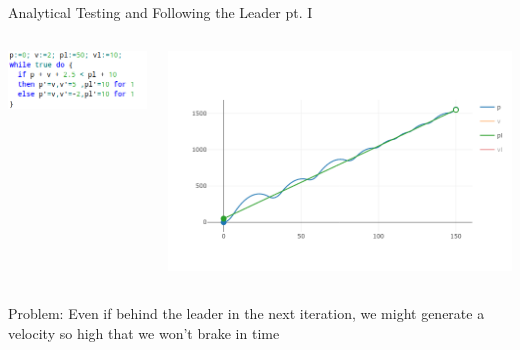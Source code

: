 \documentclass{beamer}
\begin{document}
\begin{frame}{Analytical Testing and Following the Leader pt. I}
  \begin{minipage}[0.3\textheight]{\textwidth}
  \begin{columns}[c]
  \begin{column}{0.45\textwidth}
   \hspace{0.3cm}
   \includegraphics[scale=0.38]{./images/fl1.png}
  \end{column}
  \begin{column}{1\textwidth}
    \includegraphics[scale=0.3]{./images/fl_plot.png}
  \end{column}
  \end{columns}
  \end{minipage}

  \pause
  Problem: Even if behind the leader in the next iteration, we might
  generate a velocity so high that we won't brake in time
\end{frame}
\end{document}
